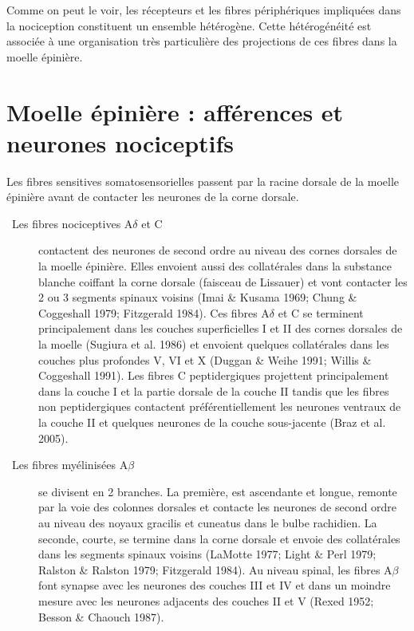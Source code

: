 \documentclass[a4paper,12pt,twoside]{report}
\begin{document}
\bigskip 

Comme on peut le voir, les récepteurs et les fibres périphériques impliquées dans la nociception constituent un ensemble hétérogène. Cette hétérogénéité est associée à une organisation très particulière des projections de ces fibres dans la moelle épinière. 

\section{Moelle épinière : afférences et neurones nociceptifs}

Les fibres sensitives somatosensorielles passent par la racine dorsale de la moelle épinière avant de contacter les neurones de la corne dorsale.
 
\begin{description}
\item [\textbullet~Les fibres nociceptives A$\delta$ et C] contactent des neurones de second ordre au niveau des cornes dorsales de la moelle épinière. Elles envoient aussi des collatérales dans la substance blanche coiffant la corne dorsale (faisceau de Lissauer) et vont contacter les 2 ou 3 segments spinaux voisins (Imai \& Kusama 1969; Chung \& Coggeshall 1979; Fitzgerald 1984). Ces fibres A$\delta$ et C se terminent principalement dans les couches superficielles I et II des cornes dorsales de la moelle (Sugiura et al. 1986) et envoient quelques collatérales dans les couches plus profondes V, VI et X (Duggan \& Weihe 1991; Willis \& Coggeshall 1991). Les fibres C peptidergiques projettent principalement dans la couche I et la partie dorsale de la couche II tandis que les fibres non peptidergiques contactent préférentiellement les neurones ventraux de la couche II et quelques neurones de la couche sous-jacente (Braz et al. 2005).

\item [\textbullet~Les fibres myélinisées A$\beta$] se divisent en 2 branches. La première, est ascendante et longue, remonte par la voie des colonnes dorsales et contacte les neurones de second ordre au niveau des noyaux gracilis et cuneatus dans le bulbe rachidien. La seconde, courte, se termine dans la corne dorsale et envoie des collatérales dans les segments spinaux voisins (LaMotte 1977; Light \& Perl 1979; Ralston \& Ralston 1979; Fitzgerald 1984). Au niveau spinal, les fibres A$\beta$ font synapse avec les neurones des couches III et IV et dans un moindre mesure avec les neurones adjacents des couches II et V (Rexed 1952; Besson \& Chaouch 1987).\end{description}
\end{document}

